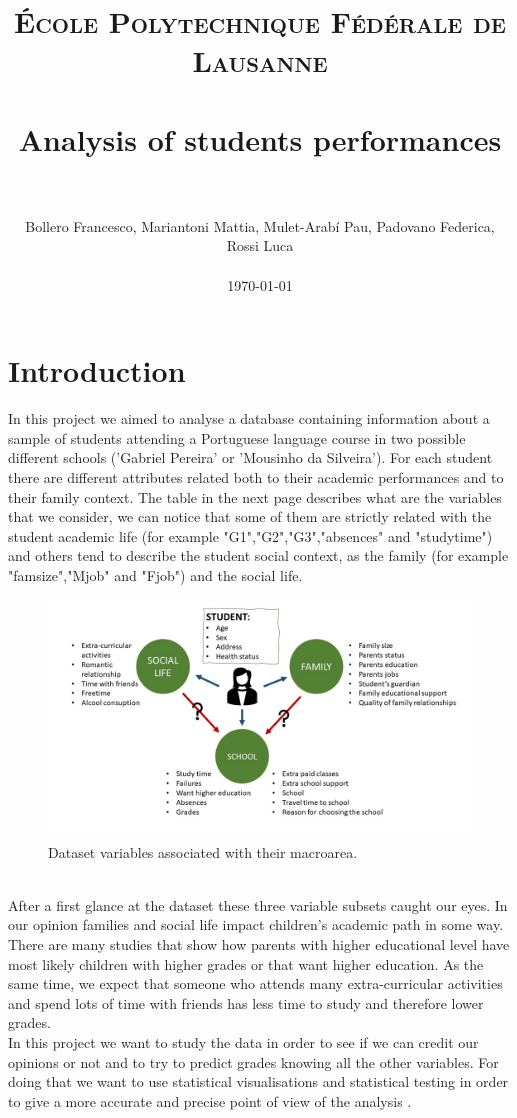 \documentclass[a4paper, 11pt]{report}
\title{
		\usefont{OT1}{bch}{b}{n}
		\normalfont \normalsize \textsc{École Polytechnique Fédérale de Lausanne} \\ [25pt]
		\horrule{0.5pt} \\[0.4cm]
		\huge Analysis of students performances \\
		\horrule{2pt} \\[0.5cm]
}
\author{
		\normalfont 								\normalsize
        Bollero Francesco, Mariantoni Mattia, Mulet-Arabí Pau, Padovano Federica, Rossi Luca\\\\[-3pt]		\normalsize
        \today
}
\date{}
\theoremstyle{definition}
\numberwithin{equation}{section}		%
\numberwithin{table}{section}				%
\begin{document}
\maketitle
\section*{Introduction}
In this project we aimed to analyse a database containing information about a sample of students attending a Portuguese language course in two possible different schools ('Gabriel Pereira' or 'Mousinho da Silveira'). For each student there are different attributes related both to their academic performances and to their family context. The table in the next page describes what are the variables that we consider, we can notice that some of them are strictly related with the student academic life (for example "G1","G2","G3","absences" and "studytime") and others tend to describe the student social context, as the family (for example "famsize","Mjob" and "Fjob") and the social life.
 
\begin{figure}[h]\centering
\includegraphics[scale=0.4]{variables.jpg}
\caption{Dataset variables associated with their macroarea.}
\end{figure}

\\After a first glance at the dataset these three variable subsets caught our eyes. In our opinion families and social life impact children's academic path in some way. There are many studies that show how parents with higher educational level have most likely children with higher grades or that want higher education. As the same time, we expect that someone who attends many extra-curricular activities and spend lots of time with friends has less time to study and therefore lower grades. 
\\In this project we want to study the data in order to see if we can credit our opinions or not and to try to predict grades knowing all the other variables. For doing that we want to use statistical visualisations and statistical testing in order to give a more accurate and precise point of view of the analysis .
\end{document}
